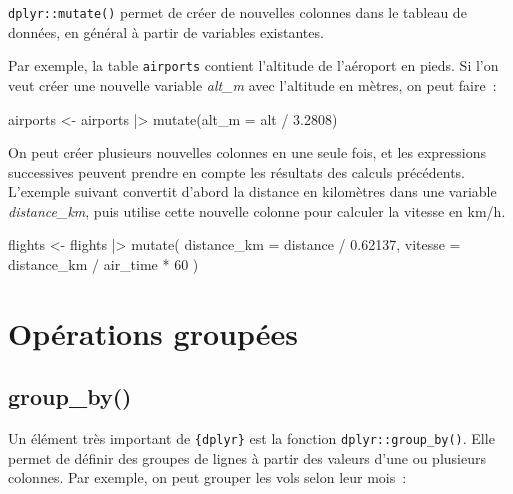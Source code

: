 \documentclass[
  letterpaper,
  DIV=11,
  numbers=noendperiod,
  oneside]{scrreprt}
\newenvironment{Shaded}{\begin{snugshade}}{\end{snugshade}}
\newcommand{\AttributeTok}[1]{\textcolor[rgb]{0.40,0.45,0.13}{#1}}
\newcommand{\DecValTok}[1]{\textcolor[rgb]{0.68,0.00,0.00}{#1}}
\newcommand{\FloatTok}[1]{\textcolor[rgb]{0.68,0.00,0.00}{#1}}
\newcommand{\FunctionTok}[1]{\textcolor[rgb]{0.28,0.35,0.67}{#1}}
\newcommand{\NormalTok}[1]{\textcolor[rgb]{0.00,0.23,0.31}{#1}}
\newcommand{\OtherTok}[1]{\textcolor[rgb]{0.00,0.23,0.31}{#1}}
\newcommand{\SpecialCharTok}[1]{\textcolor[rgb]{0.37,0.37,0.37}{#1}}
\begin{document}
\texttt{dplyr::mutate()} permet de créer de nouvelles colonnes dans le
tableau de données, en général à partir de variables existantes.

Par exemple, la table \texttt{airports} contient l'altitude de
l'aéroport en pieds. Si l'on veut créer une nouvelle variable
\emph{alt\_m} avec l'altitude en mètres, on peut faire~:

\begin{Shaded}
\begin{Highlighting}[]
\NormalTok{airports }\OtherTok{\textless{}{-}} 
\NormalTok{  airports }\SpecialCharTok{|\textgreater{}} 
  \FunctionTok{mutate}\NormalTok{(}\AttributeTok{alt\_m =}\NormalTok{ alt }\SpecialCharTok{/} \FloatTok{3.2808}\NormalTok{)}
\end{Highlighting}
\end{Shaded}

On peut créer plusieurs nouvelles colonnes en une seule fois, et les
expressions successives peuvent prendre en compte les résultats des
calculs précédents. L'exemple suivant convertit d'abord la distance en
kilomètres dans une variable \emph{distance\_km}, puis utilise cette
nouvelle colonne pour calculer la vitesse en km/h.

\begin{Shaded}
\begin{Highlighting}[]
\NormalTok{flights }\OtherTok{\textless{}{-}} 
\NormalTok{  flights }\SpecialCharTok{|\textgreater{}} 
  \FunctionTok{mutate}\NormalTok{(}
    \AttributeTok{distance\_km =}\NormalTok{ distance }\SpecialCharTok{/} \FloatTok{0.62137}\NormalTok{,}
    \AttributeTok{vitesse =}\NormalTok{ distance\_km }\SpecialCharTok{/}\NormalTok{ air\_time }\SpecialCharTok{*} \DecValTok{60}
\NormalTok{)}
\end{Highlighting}
\end{Shaded}

\hypertarget{opuxe9rations-groupuxe9es}{%
\section{Opérations groupées}\label{opuxe9rations-groupuxe9es}}

\hypertarget{group_by}{%
\subsection{group\_by()}\label{group_by}}

Un élément très important de \texttt{\{dplyr\}} est la fonction
\texttt{dplyr::group\_by()}. Elle permet de définir des groupes de
lignes à partir des valeurs d'une ou plusieurs colonnes. Par exemple, on
peut grouper les vols selon leur mois~:
\end{document}

